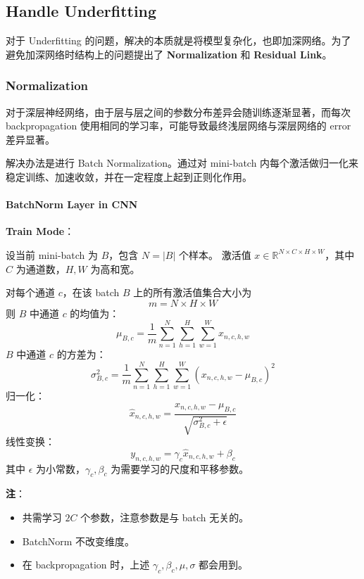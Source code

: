 \subsection{Handle Underfitting}\label{handle-underfitting}

对于 Underfitting
的问题，解决的本质就是将模型复杂化，也即加深网络。为了避免加深网络时结构上的问题提出了
\textbf{Normalization} 和 \textbf{Residual Link}。

\subsubsection{Normalization}\label{normalization}

对于深层神经网络，由于层与层之间的参数分布差异会随训练逐渐显著，而每次
backpropagation 使用相同的学习率，可能导致最终浅层网络与深层网络的 error
差异显著。

解决办法是进行 Batch Normalization。通过对 mini-batch
内每个激活做归一化来稳定训练、加速收敛，并在一定程度上起到正则化作用。

\paragraph{BatchNorm Layer in CNN}\label{batchnorm-layer-in-cnn}

\textbf{Train Mode}：

设当前 mini-batch 为 \(B\)，包含 \(N = |B|\) 个样本。 激活值
\(x \in \mathbb{R}^{N \times C \times H \times W}\)，其中 \(C\)
为通道数，\(H, W\) 为高和宽。

对每个通道 \(c\)，在该 batch \(B\) 上的所有激活值集合大小为 \[
m = N \times H \times W
\] 则 \(B\) 中通道 \(c\) 的均值为： \[
\mu_{B, c} = \frac{1}{m}\sum_{n=1}^N \sum_{h=1}^H \sum_{w=1}^W x_{n, c, h, w}
\] \(B\) 中通道 \(c\) 的方差为： \[
\sigma_{B, c}^2 = \frac{1}{m}\sum_{n=1}^N \sum_{h=1}^H \sum_{w=1}^W (x_{n, c, h, w} - \mu_{B, c})^2
\] 归一化： \[
\hat x_{n, c, h, w} = \frac{x_{n, c, h, w} - \mu_{B, c}}{\sqrt{\sigma_{B, c}^2 + \epsilon}}
\] 线性变换： \[
y_{n, c, h, w} = \gamma_c \hat x_{n, c, h, w} + \beta_c
\] 其中 \(\epsilon\) 为小常数，\(\gamma_c, \beta_c\)
为需要学习的尺度和平移参数。

\textbf{注}：

\begin{itemize}
\tightlist
\item
  共需学习 \(2C\) 个参数，注意参数是与 batch 无关的。
\item
  BatchNorm 不改变维度。
\item
  在 backpropagation 时，上述 \(\gamma_c, \beta_c, \mu, \sigma\)
  都会用到。
\end{itemize}

